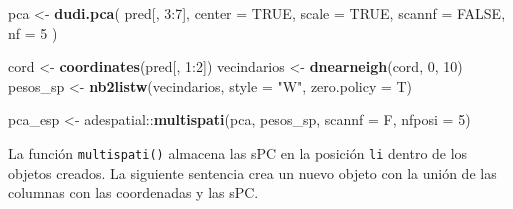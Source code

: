 \documentclass[11pt,b5paper,]{krantz}
\newenvironment{Shaded}{}{}
\newcommand{\KeywordTok}[1]{\textcolor[rgb]{0.00,0.44,0.13}{\textbf{#1}}}
\newcommand{\DataTypeTok}[1]{\textcolor[rgb]{0.56,0.13,0.00}{#1}}
\newcommand{\DecValTok}[1]{\textcolor[rgb]{0.25,0.63,0.44}{#1}}
\newcommand{\StringTok}[1]{\textcolor[rgb]{0.25,0.44,0.63}{#1}}
\newcommand{\CommentTok}[1]{\textcolor[rgb]{0.38,0.63,0.69}{\textit{#1}}}
\newcommand{\OtherTok}[1]{\textcolor[rgb]{0.00,0.44,0.13}{#1}}
\newcommand{\OperatorTok}[1]{\textcolor[rgb]{0.40,0.40,0.40}{#1}}
\newcommand{\NormalTok}[1]{#1}
\begin{document}
\begin{Shaded}
\begin{Highlighting}[]
\NormalTok{pca <-}
\StringTok{  }\KeywordTok{dudi.pca}\NormalTok{(}
\NormalTok{    pred[, }\DecValTok{3}\OperatorTok{:}\DecValTok{7}\NormalTok{],}
    \DataTypeTok{center =} \OtherTok{TRUE}\NormalTok{,}
    \DataTypeTok{scale =} \OtherTok{TRUE}\NormalTok{,}
    \DataTypeTok{scannf =} \OtherTok{FALSE}\NormalTok{,}
    \DataTypeTok{nf =} \DecValTok{5}
\NormalTok{  )}

\NormalTok{cord <-}\StringTok{ }\KeywordTok{coordinates}\NormalTok{(pred[, }\DecValTok{1}\OperatorTok{:}\DecValTok{2}\NormalTok{])}
\NormalTok{vecindarios <-}\StringTok{ }\KeywordTok{dnearneigh}\NormalTok{(cord, }\DecValTok{0}\NormalTok{, }\DecValTok{10}\NormalTok{)}
\NormalTok{pesos_sp <-}\StringTok{ }\KeywordTok{nb2listw}\NormalTok{(vecindarios, }
                     \DataTypeTok{style =} \StringTok{"W"}\NormalTok{, }
                     \DataTypeTok{zero.policy =}\NormalTok{ T)}

\NormalTok{pca_esp <-}
\StringTok{  }\NormalTok{adespatial}\OperatorTok{::}\KeywordTok{multispati}\NormalTok{(pca, pesos_sp, }
                         \DataTypeTok{scannf =}\NormalTok{ F, }\DataTypeTok{nfposi =} \DecValTok{5}\NormalTok{)}
\end{Highlighting}
\end{Shaded}

La función \texttt{multispati()} almacena las sPC en la posición
\texttt{li} dentro de los objetos creados. La siguiente sentencia crea
un nuevo objeto con la unión de las columnas con las coordenadas y las
sPC.

\begin{Shaded}
\end{Shaded}
\end{document}
